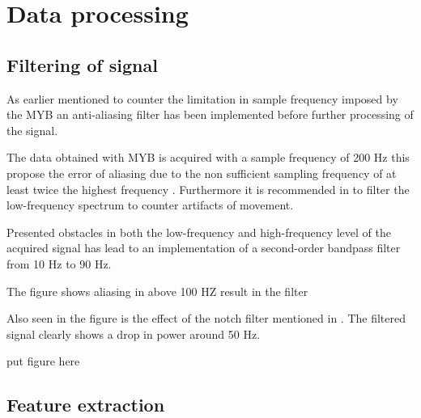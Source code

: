 

\section{Data processing}




\subsection{Filtering of signal} \label{sec:prePros} 

As earlier mentioned to counter the limitation in sample frequency imposed by the MYB an anti-aliasing filter has been implemented before further processing of the signal.  


The data obtained with MYB is acquired with a sample frequency of 200 Hz this propose the error of aliasing due to the non sufficient sampling frequency of at least twice the highest frequency \cite{Pozzo2004}. Furthermore it is recommended in \cite{DeLuca2010} to filter the low-frequency spectrum to counter artifacts of movement.



 Presented obstacles in both the low-frequency and high-frequency level of the acquired signal has lead to an implementation of a second-order bandpass filter from 10 Hz to 90 Hz. 

The figure shows aliasing in above 100 HZ 
result in the filter 

Also seen in the figure is the effect of the notch filter mentioned in . The filtered signal clearly shows a drop in power around 50 Hz. 

put figure here 



\subsection{Feature extraction}
































